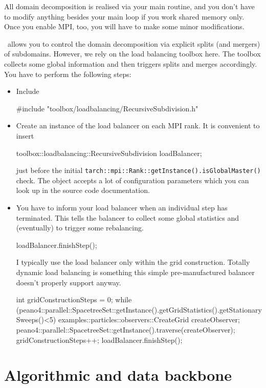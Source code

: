 All domain decomposition is realised via your main routine, and you don't have
to modify anything besides your main loop if you work shared memory only.
Once you enable MPI, too, you will have to make some minor modifications.


\Peano\ allows you to control the domain decomposition via explicit splits (and
mergers) of subdomains.
However, we rely on the load balancing toolbox here.
The toolbox collects some global information and then triggers splits and merges
accordingly.
You have to perform the following steps:
\begin{itemize}
  \item Include 
\begin{code}
#include "toolbox/loadbalancing/RecursiveSubdivision.h"
\end{code}
  \item Create an instance of the load balancer on each MPI rank. It is
  convenient to insert
\begin{code}
toolbox::loadbalancing::RecursiveSubdivision  loadBalancer;
\end{code}
  just before the initial
  \texttt{tarch::mpi::Rank::getInstance().isGlobalMaster()} check. The object
  accepts a lot of configuration parameters which you can look up in the source
  code documentation.
  \item You have to inform your load balancer when an individual step has
  terminated. This tells the balancer to collect some global statistics and
  (eventually) to trigger some rebalancing.
\begin{code}
loadBalancer.finishStep();
\end{code}
  I typically use the load balancer only within the grid construction. Totally
  dynamic load balancing is something this simple pre-manufactured balancer
  doesn't properly support anyway.
\begin{code}
int gridConstructionSteps = 0;
while (peano4::parallel::SpacetreeSet::getInstance().getGridStatistics().getStationarySweeps()<5) {
  examples::particles::observers::CreateGrid createObserver;
  peano4::parallel::SpacetreeSet::getInstance().traverse(createObserver);
  gridConstructionSteps++;
  loadBalancer.finishStep();
}
\end{code}
\end{itemize}





\section{Algorithmic and data backbone}


